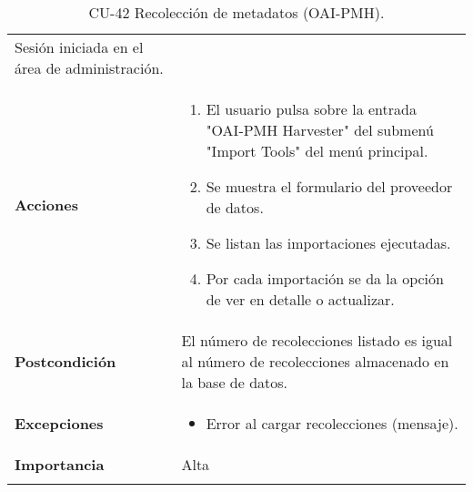 \begin{longtable}[]{@{}ll@{}}
\begin{minipage}[t]{0.75\columnwidth}
Sesión iniciada en el área de administración.\strut
\end{minipage}\tabularnewline
\begin{minipage}[t]{0.19\columnwidth}\raggedright
\textbf{Acciones}\strut
\end{minipage} & \begin{minipage}[t]{0.75\columnwidth}\raggedright
\begin{enumerate}
\def\labelenumi{\arabic{enumi}.}
\tightlist
\item
  El usuario pulsa sobre la entrada "OAI-PMH Harvester" del submenú
  "Import Tools" del menú principal.
\item
  Se muestra el formulario del proveedor de datos.
\item
  Se listan las importaciones ejecutadas.
\item
  Por cada importación se da la opción de ver en detalle o actualizar.
\end{enumerate}\strut
\end{minipage}\tabularnewline
\begin{minipage}[t]{0.19\columnwidth}\raggedright
\textbf{Postcondición}\strut
\end{minipage} & \begin{minipage}[t]{0.75\columnwidth}\raggedright
El número de recolecciones listado es igual al número de recolecciones
almacenado en la base de datos.\strut
\end{minipage}\tabularnewline
\begin{minipage}[t]{0.19\columnwidth}\raggedright
\textbf{Excepciones}\strut
\end{minipage} & \begin{minipage}[t]{0.75\columnwidth}\raggedright
\begin{itemize}
\tightlist
\item
  Error al cargar recolecciones (mensaje).
\end{itemize}\strut
\end{minipage}\tabularnewline
\begin{minipage}[t]{0.19\columnwidth}\raggedright
\textbf{Importancia}\strut
\end{minipage} & \begin{minipage}[t]{0.75\columnwidth}\raggedright
Alta\strut
\end{minipage}\tabularnewline
\bottomrule
\caption{CU-42 Recolección de metadatos (OAI-PMH).}
\end{longtable}

